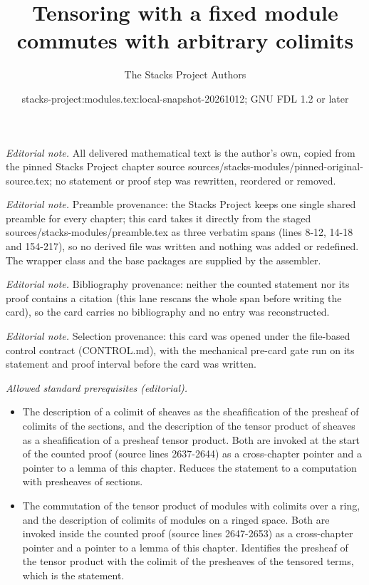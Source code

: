 \documentclass[10pt,a4paper]{amsart}
\title{Tensoring with a fixed module commutes with arbitrary colimits}
\author{The Stacks Project Authors}
\date{stacks-project:modules.tex:local-snapshot-20261012; GNU FDL 1.2 or later}
\theoremstyle{plain}
\theoremstyle{definition}
\theoremstyle{remark}
\numberwithin{equation}{subsection}
\begin{document}
\maketitle
\noindent\textit{Editorial note.} All delivered mathematical text is the author's own, copied from the pinned Stacks Project chapter source sources/stacks-modules/pinned-original-source.tex; no statement or proof step was rewritten, reordered or removed.\par\medskip
\noindent\textit{Editorial note.} Preamble provenance: the Stacks Project keeps one single shared preamble for every chapter; this card takes it directly from the staged sources/stacks-modules/preamble.tex as three verbatim spans (lines 8-12, 14-18 and 154-217), so no derived file was written and nothing was added or redefined. The wrapper class and the base packages are supplied by the assembler.\par\medskip
\noindent\textit{Editorial note.} Bibliography provenance: neither the counted statement nor its proof contains a citation (this lane rescans the whole span before writing the card), so the card carries no bibliography and no entry was reconstructed.\par\medskip
\noindent\textit{Editorial note.} Selection provenance: this card was opened under the file-based control contract (CONTROL.md), with the mechanical pre-card gate run on its statement and proof interval before the card was written.\par\medskip
\noindent\textit{Allowed standard prerequisites (editorial).}\begin{itemize}
\item The description of a colimit of sheaves as the sheafification of the presheaf of colimits of the sections, and the description of the tensor product of sheaves as a sheafification of a presheaf tensor product. Both are invoked at the start of the counted proof (source lines 2637-2644) as a cross-chapter pointer and a pointer to a lemma of this chapter. Reduces the statement to a computation with presheaves of sections.
\item The commutation of the tensor product of modules with colimits over a ring, and the description of colimits of modules on a ringed space. Both are invoked inside the counted proof (source lines 2647-2653) as a cross-chapter pointer and a pointer to a lemma of this chapter. Identifies the presheaf of the tensor product with the colimit of the presheaves of the tensored terms, which is the statement.
\end{itemize}\medskip
\end{document}
